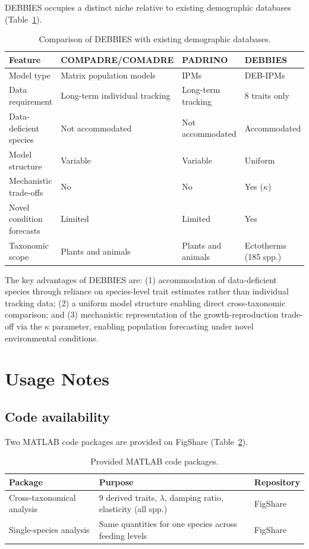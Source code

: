 \documentclass[11pt]{article}
\begin{document}
DEBBIES occupies a distinct niche relative to existing demographic databases (Table~\ref{tab:comparison}).

\begin{table}[ht]
\centering
\caption{Comparison of DEBBIES with existing demographic databases.}
\label{tab:comparison}
\begin{tabular}{llll}
\toprule
Feature & COMPADRE/COMADRE & PADRINO & DEBBIES \\
\midrule
Model type & Matrix population models & IPMs & DEB-IPMs \\
Data requirement & Long-term individual tracking & Long-term tracking & 8 traits only \\
Data-deficient species & Not accommodated & Not accommodated & Accommodated \\
Model structure & Variable & Variable & Uniform \\
Mechanistic trade-offs & No & No & Yes ($\kappa$) \\
Novel condition forecasts & Limited & Limited & Yes \\
Taxonomic scope & Plants and animals & Plants and animals & Ectotherms (185 spp.) \\
\bottomrule
\end{tabular}
\end{table}

The key advantages of DEBBIES are: (1) accommodation of data-deficient species through reliance on species-level trait estimates rather than individual tracking data; (2) a uniform model structure enabling direct cross-taxonomic comparison; and (3) mechanistic representation of the growth-reproduction trade-off via the $\kappa$ parameter, enabling population forecasting under novel environmental conditions.

\section{Usage Notes}

\subsection{Code availability}

Two MATLAB code packages are provided on FigShare (Table~\ref{tab:code}).

\begin{table}[ht]
\centering
\caption{Provided MATLAB code packages.}
\label{tab:code}
\begin{tabular}{lll}
\toprule
Package & Purpose & Repository \\
\midrule
Cross-taxonomical analysis & 9 derived traits, $\lambda$, damping ratio, elasticity (all spp.) & FigShare \\
Single-species analysis & Same quantities for one species across feeding levels & FigShare \\
\bottomrule
\end{tabular}
\end{table}
\end{document}
